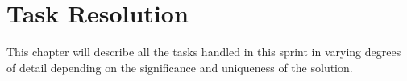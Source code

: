 \chapter{Task Resolution}
This chapter will describe all the tasks handled in this sprint in varying degrees of detail depending on the significance and uniqueness of the solution.








